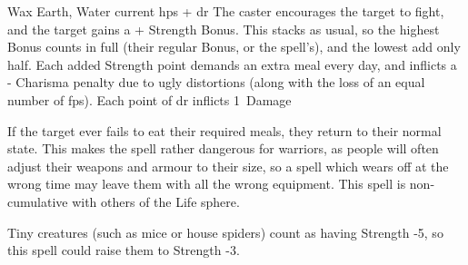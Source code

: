   {}%
  {Wax}%
  {Earth, Water}%
  {current \glspl{hp} + \gls{dr}}%
  {The caster encourages the target to fight, and the target gains a + Strength Bonus.
  This stacks as usual, so the highest Bonus counts in full (their regular Bonus, or the spell's), and the lowest add only half.
  Each added Strength point demands an extra meal every day, and inflicts a - Charisma penalty due to ugly distortions (along with the loss of an equal number of \glspl{fp}).
  Each point of \gls{dr} inflicts 1~Damage}%
  {
    If the target ever fails to eat their required meals, they return to their normal state.
    This makes the spell rather dangerous for warriors, as people will often adjust their weapons and armour to their size, so a spell which wears off at the wrong time may leave them with all the wrong equipment.
    This spell is non-cumulative with others of the Life sphere.

    Tiny creatures (such as mice or house spiders) count as having Strength -5, so this spell could raise them to Strength -3.
    }
